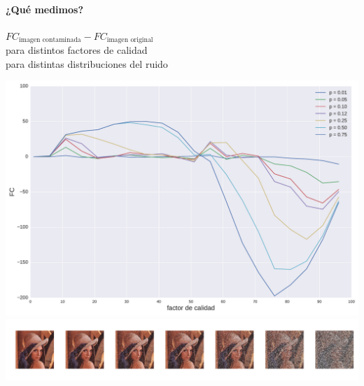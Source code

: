 \documentclass{beamer}
\begin{document}
\begin{frame}
    \framesubtitle{¿Qué medimos?}
    $FC_{\text{imagen contaminada}} - FC_{\text{imagen original}}$\\
    \vspace{3mm}
    para distintos factores de calidad\\
    \vspace{3mm}
    para distintas distribuciones del ruido
\end{frame}

\begin{frame}
    \begin{center}
        \includegraphics[scale=0.2]{fig/lena_SP_plot.pdf} \\
        \vspace{3mm}
        \includegraphics[scale=0.2]{fig/lenas_SP_images.pdf}
    \end{center}
\end{frame}
\end{document}
